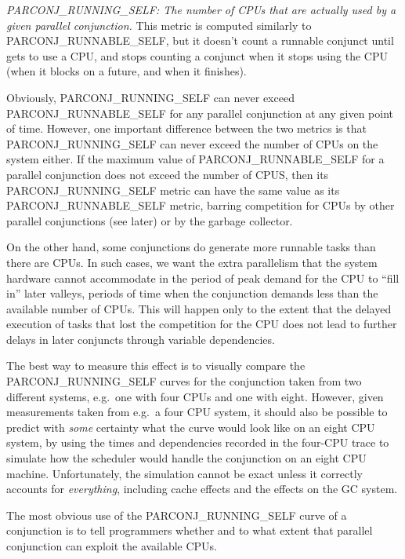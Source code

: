 \emph{PARCONJ\_RUNNING\_SELF:
The number of CPUs that are actually used by a given parallel conjunction.}
This metric is computed similarly to PARCONJ\_RUNNABLE\_SELF,
but it doesn't count a runnable conjunct until gets to use a CPU,
and stops counting a conjunct when it stops using the CPU
(when it blocks on a future, and when it finishes).

Obviously, PARCONJ\_RUNNING\_SELF can never exceed PARCONJ\_RUNNABLE\_SELF
for any parallel conjunction at any given point of time.
However, one important difference between the two metrics
is that PARCONJ\_RUNNING\_SELF can never exceed
the number of CPUs on the system either.
If the maximum value of PARCONJ\_RUNNABLE\_SELF for a parallel conjunction
does not exceed the number of CPUS,
then its PARCONJ\_RUNNING\_SELF metric
can have the same value as its PARCONJ\_RUNNABLE\_SELF metric,
barring competition for CPUs by other parallel conjunctions (see later)
or by the garbage collector.

On the other hand, some conjunctions
do generate more runnable tasks than there are CPUs.
In such cases, we want the extra parallelism
that the system hardware cannot accommodate
in the period of peak demand for the CPU
to ``fill in'' later valleys,
periods of time when the conjunction demands
less than the available number of CPUs.
This will happen only to the extent that
the delayed execution of tasks that lost the competition for the CPU
does not lead to further delays in later conjuncts
through variable dependencies.

The best way to measure this effect
is to visually compare the PARCONJ\_RUNNING\_SELF curves for the conjunction
taken from two different systems,
e.g.\ one with four CPUs and one with eight.
However, given measurements taken from e.g.\ a four CPU system,
it should also be possible to predict with \emph{some} certainty
what the curve would look like on an eight CPU system,
by using the times and dependencies recorded in the four-CPU trace
to simulate how the scheduler would handle the conjunction
on an eight CPU machine.
Unfortunately, the simulation cannot be exact
unless it correctly accounts for \emph{everything},
including cache effects and the effects on the GC system.

The most obvious use of the PARCONJ\_RUNNING\_SELF curve of a conjunction
is to tell programmers whether and to what extent
that parallel conjunction can exploit the available CPUs.


